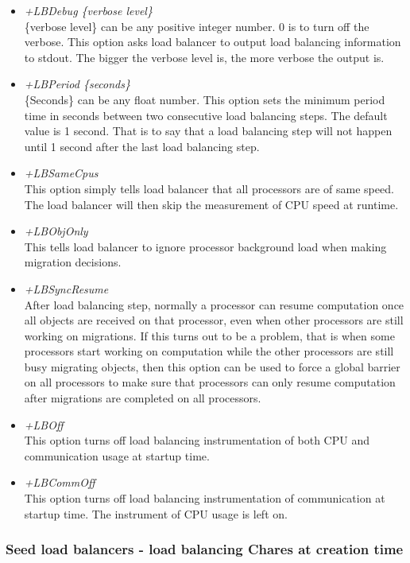\begin{enumerate}
\begin{itemize}
\item {\em +LBDebug \{verbose level\}} \\
     \{verbose level\} can be any positive integer number. 0 is to turn off the verbose. 
     This option asks load balancer to output load balancing information to stdout.
     The bigger the verbose level is, the more verbose the output is.
\item {\em +LBPeriod \{seconds\}} \\
     \{Seconds\} can be any float number. This option sets the minimum period time in 
seconds between two consecutive load balancing steps. The default value is 
1 second. That is to say that a load balancing step will not happen until
1 second after the last load balancing step.
\item {\em +LBSameCpus} \\
     This option simply tells load balancer that all processors are of same speed.
     The load balancer will then skip the measurement of CPU speed at runtime.
\item {\em +LBObjOnly} \\
     This tells load balancer to ignore processor background load when making migration decisions.
\item {\em +LBSyncResume} \\
     After load balancing step, normally a processor can resume computation 
once all objects are received on that processor, even when other processors
are still working on migrations.  If this turns out to be a problem, 
that is when some processors start working on computation while the other 
processors are still busy migrating objects, then this option can be used to force 
a global barrier on all processors to make sure that processors can only resume 
computation after migrations are completed on all processors.
\item {\em +LBOff} \\
     This option turns off load balancing instrumentation 
     of both CPU and communication usage at startup time. 
\item {\em +LBCommOff} \\
     This option turns off load balancing instrumentation of communication at startup time. 
     The instrument of CPU usage is left on.
\end{itemize}

\end{enumerate}

\subsubsection{Seed load balancers - load balancing Chares at creation time}

